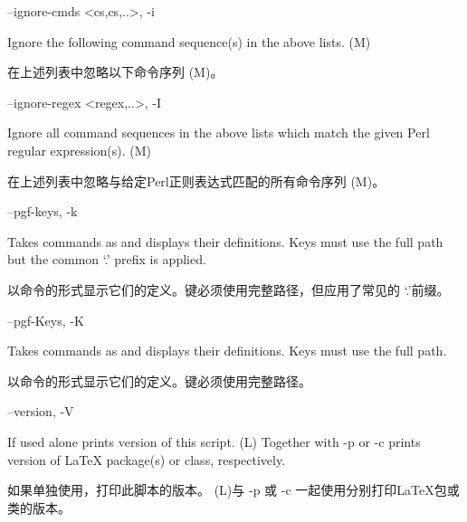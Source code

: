 \documentclass{article}
\newenvironment{options}{%
    \def\cstart{\begingroup\ttfamily\par\noindent\ignorespaces}%
    \def\csep{\endgroup\begingroup\list {}{}\item \relax}%
    \def\cend{\endlist\par\medskip\endgroup\cstart}%
    \cstart
}{%
    \endgroup
}
\begin{document}
\begin{options}
--ignore-cmds \MacroArgs<cs,cs,..>,  -i            \csep 
Ignore the following command sequence(s) in the above lists. (M)

在上述列表中忽略以下命令序列 (M)。
\cend
\end{options}

\begin{options}
--ignore-regex \MacroArgs<regex,..>, -I            \csep 
Ignore all command sequences in the above lists which match the given Perl regular expression(s). (M)

在上述列表中忽略与给定Perl正则表达式匹配的所有命令序列 (M)。
\cend
\end{options}

\begin{options}
--pgf-keys, -k                                     \csep 
Takes commands as  and displays their definitions. Keys must use the full path but the common `.\@cmd' prefix is applied.

以命令的形式显示它们的定义。键必须使用完整路径，但应用了常见的 `.\@cmd'前缀。
\cend
\end{options}

\begin{options}
--pgf-Keys, -K                                     \csep 
Takes commands as  and displays their definitions. Keys must use the full path.

以命令的形式显示它们的定义。键必须使用完整路径。
\cend
\end{options}

\begin{options}
--version, -V                                      \csep 
If used alone prints version of this script.
(L) Together with -p or -c prints version of LaTeX package(s) or class, respectively.

如果单独使用，打印此脚本的版本。 (L)与 -p 或 -c 一起使用分别打印LaTeX包或类的版本。
\cend
\end{options}
\end{document}
